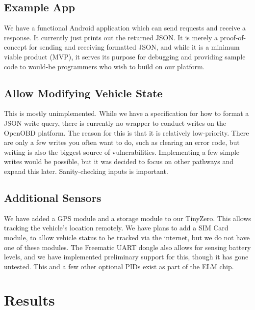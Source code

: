 \documentclass[10pt,letterpaper,unboxed,cm]{article}
\begin{document}
\subsection{Example App}

We have a functional Android application which can send requests and receive a response. It currently just prints out the returned JSON. It is merely a proof-of-concept for sending and receiving formatted JSON, and while it is a minimum viable product (MVP), it serves its purpose for debugging and providing sample code to would-be programmers who wish to build on our platform.

\subsection{Allow Modifying Vehicle State}

This is mostly unimplemented. While we have a specification for how to format a JSON write query, there is currently no wrapper to conduct writes on the OpenOBD platform. The reason for this is that it is relatively low-priority. There are only a few writes you often want to do, such as clearing an error code, but writing is also the biggest source of vulnerabilities. Implementing a few simple writes would be possible, but it was decided to focus on other pathways and expand this later. Sanity-checking inputs is important.

\subsection{Additional Sensors}

We have added a GPS module and a storage module to our TinyZero. This allows tracking the vehicle's location remotely. We have plans to add a SIM Card module, to allow vehicle status to be tracked via the internet, but we do not have one of these modules. The Freematic UART dongle also allows for sensing battery levels, and we have implemented preliminary support for this, though it has gone untested. This and a few other optional PIDs exist as part of the ELM chip.

\section{Results}
\end{document}
